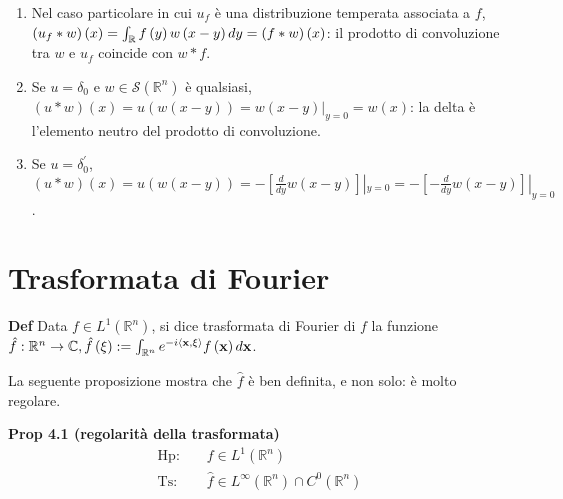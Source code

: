 \documentclass{article}
\begin{document}
\begin{enumerate}
\item Nel caso particolare in cui $u_{f}$ \`{e} una distribuzione temperata
associata a $f$, $\left( u_{f}\ast w\right) \left( x\right) =\int_{%
\mathbb{R}
}f\left( y\right) w\left( x-y\right) dy=\left( f\ast w\right) \left(
x\right) $: il prodotto di convoluzione tra $w$ e $u_{f}$ coincide con $%
w\ast f$.

\item Se $u=\delta _{0}$ e $w\in \mathcal{S}\left( 
\mathbb{R}
^{n}\right) $ \`{e} qualsiasi, $\left( u\ast w\right) \left( x\right)
=u\left( w\left( x-y\right) \right) =w\left( x-y\right) |_{y=0}=w\left(
x\right) $: la delta \`{e} l'elemento neutro del prodotto di convoluzione.

\item Se $u=\delta _{0}^{\prime }$, $\left( u\ast w\right) \left( x\right)
=u\left( w\left( x-y\right) \right) =-\left[ \frac{d}{dy}w\left( x-y\right) %
\right] |_{y=0}=-\left[ -\frac{d}{dy}w\left( x-y\right) \right] |_{y=0}$.
\end{enumerate}

\section{Trasformata di Fourier}

\textbf{Def} Data $f\in L^{1}\left( 
\mathbb{R}
^{n}\right) $, si dice trasformata di Fourier di $f$ la funzione $\hat{f}:%
\mathbb{R}
^{n}\rightarrow 
\mathbb{C}
,\hat{f}\left( \xi \right) :=\int_{%
\mathbb{R}
^{n}}e^{-i\left\langle \mathbf{x,\xi }\right\rangle }f\left( \mathbf{x}%
\right) d\mathbf{x}$.

La seguente proposizione mostra che $\hat{f}$ \`{e} ben definita, e non
solo: \`{e} molto regolare.

\textbf{Prop 4.1 (regolarit\`{a} della trasformata)}%
\begin{eqnarray*}
\text{Hp}\text{: } &&f\in L^{1}\left( 
\mathbb{R}
^{n}\right) \\
\text{Ts}\text{: } &&\hat{f}\in L^{\infty }\left( 
\mathbb{R}
^{n}\right) \cap C^{0}\left( 
\mathbb{R}
^{n}\right)
\end{eqnarray*}
\end{document}
